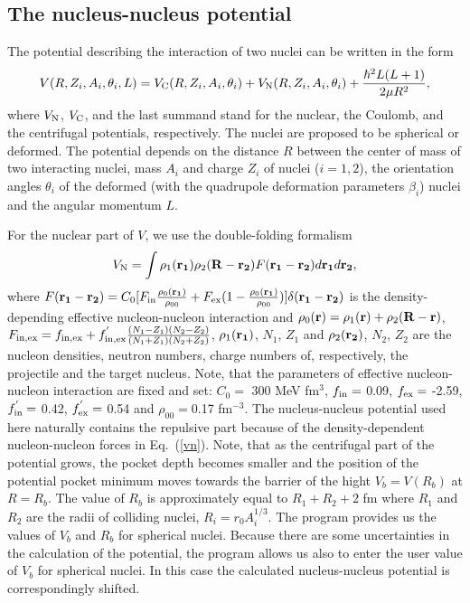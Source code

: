\documentclass[preprint,review,12pt]{elsarticle}
\begin{document}
\subsection{The nucleus-nucleus potential}

  The potential describing the interaction of two nuclei can
  be written in the form \cite{poten}
  \begin{eqnarray}
  V(R,Z_i, A_i,\theta_i,L)=V_{\rm C}(R,Z_i, A_i,\theta_i)+V_{\rm N}(R,Z_i, A_i,\theta_i)+\frac{\hbar^2 L(L+1)}{2\mu R^2},
  \label{pot}
  \end{eqnarray}
  where $V_{\rm N}$, $V_{\rm C}$, and the last summand stand for the nuclear,
  the Coulomb, and the centrifugal potentials, respectively.
  The nuclei are proposed to be spherical or deformed. The
  potential depends on the distance $R$ between the center of
  mass of two interacting nuclei, mass $A_i$ and charge $Z_i$ of
  nuclei ($i = 1, 2$), the orientation angles $\theta_i$ of the deformed
  (with the quadrupole deformation parameters $\beta_i$) nuclei
  and the angular momentum $L$.

  For the nuclear part of $V$, we use the double-folding formalism
  \begin{eqnarray}
  V_{\rm N}=\int\rho_1(\bold {r_1})\rho_2(\bold{R}-\bold{r_2})F(\bold{r_1}-\bold{r_2})d\bold{r_1}d\bold{r_2},
  \label{vn}
  \end{eqnarray}
  where
  $F(\bold {r_1}-\bold{r_2})=C_0[F_{\rm in}\frac{\rho_0(\bold{r_1})}{\rho_{00}}+F_{\rm
  ex}(1-\frac{\rho_0(\bold{r_1})}{\rho_{00}})]\delta(\bold{r_1}-\bold{r_2})$
  is the density-depending effective nucleon-nucleon interaction and $\rho_0(\bold{r})=\rho_1(\bold{r})+\rho_2(\bold{R}-\bold{r})$,
  $F_{\rm in,ex}=f_{\rm in,ex}+f_{\rm in,ex}^{'}\frac{(N_1-Z_1)(N_2-Z_2)}{(N_1+Z_1)(N_2+Z_2)}$,
  $\rho_1(\bold{r_1})$, $N_1$, $Z_1$ and $\rho_2(\bold{r_2})$, $N_2$, $Z_2$ are the nucleon
  densities, neutron numbers, charge numbers of, respectively, the projectile and the target
  nucleus.
  Note, that the parameters of effective nucleon-nucleon interaction are fixed and set:
  $C_0=$ 300 MeV fm$^3$, $f_{\rm in}=$ 0.09, $f_{\rm ex}=$ -2.59, $f_{\rm in}^{'}=$ 0.42, $f_{\rm ex}^{'}=$ 0.54 and $\rho_{00}=$0.17 fm$^{-3}$.
  The nucleus-nucleus potential \cite{poten} used here naturally contains the repulsive part because of the
  density-dependent nucleon-nucleon forces in Eq.~(\ref{vn}). Note, that as the centrifugal part of the potential grows, the pocket depth becomes smaller and the position of the potential pocket minimum moves towards the barrier
  of the hight $V_b=V(R_b)$ at $R=R_b$.
  The value of $R_b$ is approximately equal to $R_1+R_2+2$ fm where $R_1$ and $R_2$ are the radii of colliding nuclei,
  $R_i=r_0A_i^{1/3}$. The program provides us the values of $V_b$ and $R_b$ for spherical
  nuclei. Because there are some uncertainties
  in the calculation of the potential, the program allows us also to enter the user value of $V_b$ for spherical
  nuclei. In this case the calculated nucleus-nucleus potential is correspondingly shifted.
\end{document}
